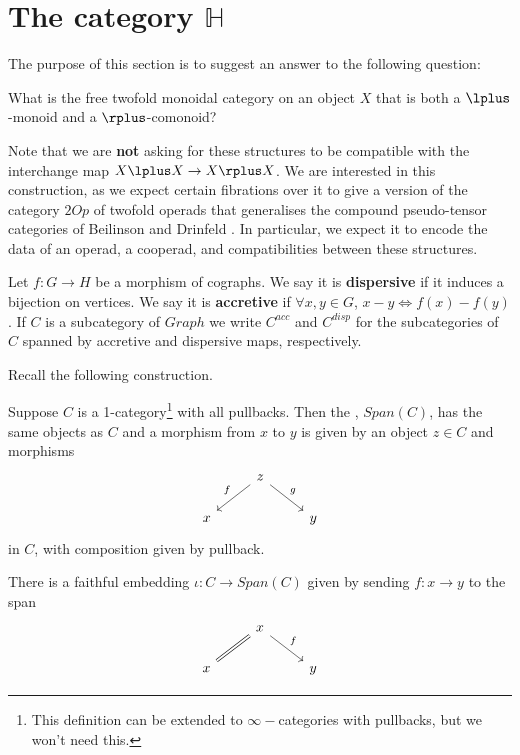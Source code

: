 \section{The category $\mathbb{H}$}\label{sec:H}
The purpose of this section is to suggest an answer to the following question:
\begin{question}
    What is the free twofold monoidal category on an object $X$ that is both a $\lplus$-monoid and a $\rplus$-comonoid?
\end{question}
Note that we are \textbf{not} asking for these structures to be compatible with the interchange map $X\lplus X\rightarrow X\rplus X$. We are interested in this construction, as we expect certain fibrations over it to give a version of the category $2Op$ of twofold operads that generalises the compound pseudo-tensor categories of Beilinson and Drinfeld \cite{BeilinsonDrinfeld}. In particular, we expect it to encode the data of an operad, a cooperad, and compatibilities between these structures.

\begin{definition}
    Let $f:G\rightarrow H$ be a morphism of cographs. We say it is \textbf{dispersive} if it induces a bijection on vertices. We say it is \textbf{accretive} if $\forall x,y\in G$, $x-y\iff f(x)-f(y)$. If $C$ is a subcategory of $Graph$ we write $C^{acc}$ and $C^{disp}$ for the subcategories of $C$ spanned by accretive and dispersive maps, respectively.
\end{definition}

Recall the following construction.

\begin{definition}
    Suppose $C$ is a 1-category\footnote{This definition can be extended to  $\infty-$categories with pullbacks, but we won't need this.} with all pullbacks. Then the , $Span(C)$, has the same objects as $C$ and a morphism from $x$ to $y$ is given by an object $z\in C$ and morphisms
\[\begin{tikzcd}
  & z \arrow[ld, "f"'] \arrow[rd, "g"] &   \\
x &                                    & y
\end{tikzcd}\] in $C$, with composition given by pullback.
\end{definition}

There is a faithful embedding $\iota: C\rightarrow{} Span(C)$ given by sending $f:x\rightarrow y$ to the span 
\[\begin{tikzcd}
  & x \arrow[ld, equal] \arrow[rd, "f"] &   \\
x &                                          & y
\end{tikzcd}\]

